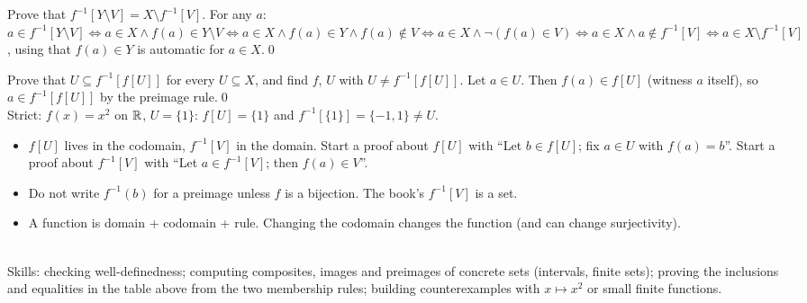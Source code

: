 \begin{hexample}
Prove that $f^{-1}[Y\setminus V]=X\setminus f^{-1}[V]$.
\solution
For any $a$: \ $a\in f^{-1}[Y\setminus V]\Leftrightarrow a\in X\wedge f(a)\in Y\setminus V\Leftrightarrow a\in X\wedge f(a)\in Y\wedge f(a)\notin V\Leftrightarrow a\in X\wedge\neg(f(a)\in V)\Leftrightarrow a\in X\wedge a\notin f^{-1}[V]\Leftrightarrow a\in X\setminus f^{-1}[V]$, using that $f(a)\in Y$ is automatic for $a\in X$.\qed
\end{hexample}

\begin{hexample}\label{ex:preimg}
Prove that $U\subseteq f^{-1}[f[U]]$ for every $U\subseteq X$, and find $f$, $U$ with $U\neq f^{-1}[f[U]]$.
\solution
Let $a\in U$. Then $f(a)\in f[U]$ (witness $a$ itself), so $a\in f^{-1}[f[U]]$ by the preimage rule.\qed\\
Strict: $f(x)=x^2$ on $\mathbb{R}$, $U=\{1\}$: $f[U]=\{1\}$ and $f^{-1}[\{1\}]=\{-1,1\}\neq U$.
\end{hexample}

\begin{warn}
\begin{itemize}
\item $f[U]$ lives in the codomain, $f^{-1}[V]$ in the domain. Start a proof about $f[U]$ with ``Let $b\in f[U]$; fix $a\in U$ with $f(a)=b$''. Start a proof about $f^{-1}[V]$ with ``Let $a\in f^{-1}[V]$; then $f(a)\in V$''.
\item Do not write $f^{-1}(b)$ for a preimage unless $f$ is a bijection. The book's $f^{-1}[V]$ is a set.
\item A function is domain + codomain + rule. Changing the codomain changes the function (and can change surjectivity).
\end{itemize}
\end{warn}

\begin{planning}
\quad {}\quad {}\\[3pt]
Skills: checking well-definedness; computing composites, images and preimages of concrete sets (intervals, finite sets); proving the inclusions and equalities in the table above from the two membership rules; building counterexamples with $x\mapsto x^2$ or small finite functions.
\end{planning}


